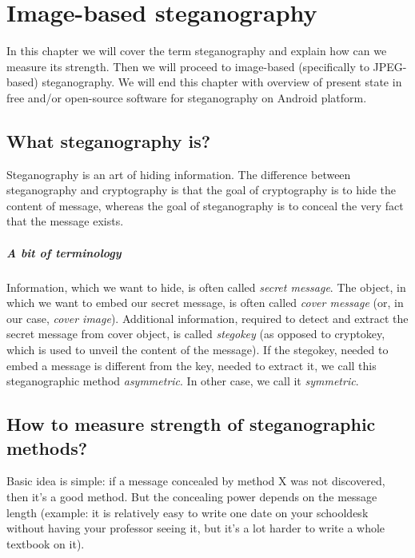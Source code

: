 \chapter{Image-based steganography}

In this chapter we will cover the term steganography and explain 
how can we measure its strength. Then we will proceed to image-based
(specifically to JPEG-based) steganography. We will end this chapter
with overview of present state in free and/or open-source software
for steganography on Android platform.

\section{What steganography is?}

Steganography is an art of hiding information. The difference between steganography and
cryptography is that the goal of cryptography is to hide the content of message, whereas
the goal of steganography is to conceal the very fact that the message exists.

\paragraph{A bit of terminology}

Information, which we want to hide, is often called \textit{secret message}. The object,
in which we want to embed our secret message, is often called \textit{cover message} (or, in our case,
\textit{cover image}). Additional information, required to detect and extract the secret message
from cover object, is called \textit{stegokey} (as opposed to cryptokey, which is used to 
unveil the content of the message). If the stegokey, needed to embed a message is different
from the key, needed to extract it, we call this steganographic method \textit{asymmetric}. In
other case, we call it \textit{symmetric}.

\section{How to measure strength of steganographic methods?}

Basic idea is simple: if a message concealed by method X was not discovered, then it's a good method.
But the concealing power depends on the message length (example: it is relatively easy
to write one date on your schooldesk without having your professor seeing it, but it's a lot
harder to write a whole textbook on it). 


